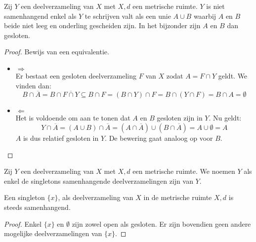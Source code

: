 \documentclass[main.tex]{subfiles}
\begin{document}
\begin{bpr}
  \label{pr:karakterisatie-niet-samenhangend}
  Zij $Y$ een deelverzameling van $X$ met $X,d$ een metrische ruimte.
  $Y$ is niet samenhangend enkel als $Y$ te schrijven valt als een unie $A \cup B$ waarbij $A$ en $B$ beide niet leeg en onderling gescheiden zijn.
  In het bijzonder zijn $A$ en $B$ dan gesloten.

  \begin{proof}
    Bewijs van een equivalentie.
    \begin{itemize}
    \item $\Rightarrow$\\
      Er bestaat een gesloten deelverzameling $F$ van $X$ zodat $A = F \cap Y$ geldt.
      We vinden dan:
      \[ B \cap \overline{A} = B \cap \overline{F \cap Y} \subseteq B \cap F = (B \cap Y) \cap F = B \cap (Y \cap F) = B \cap A = \emptyset \]
    \item $\Leftarrow$\\
      Het is voldoende om aan te tonen dat $A$ en $B$ gesloten zijn in $Y$.
      Nu geldt:
      \[ Y \cap \overline{A} = (A \cup B) \cap \overline{A} = (A \cap \overline{A}) \cup (B \cap \overline{A}) = A \cup \emptyset = A \]
      $A$ is dus relatief gesloten in $Y$.
      De bewering gaat analoog op voor $B$.
    \end{itemize}
  \end{proof}
\end{bpr}

\begin{de}
  Zij $Y$ een deelverzameling van $X$ met $X,d$ een metrische ruimte.
  We noemen $Y$  als enkel de singletons samenhangende deelverzamelingen zijn van $Y$.
\end{de}

\begin{st}
  \label{st:singleton-samenhangend}
  Een singleton $\{x\}$, als deelverzameling van $X$ in de metrische ruimte $X,d$ is steeds samenhangend.
  
  \begin{proof}
    Enkel $\{x\}$ en $\emptyset$ zijn zowel open als gesloten.
    Er zijn bovendien geen andere mogelijke deelverzamelingen van $\{x\}$.
  \end{proof}
\end{st}
\end{document}
